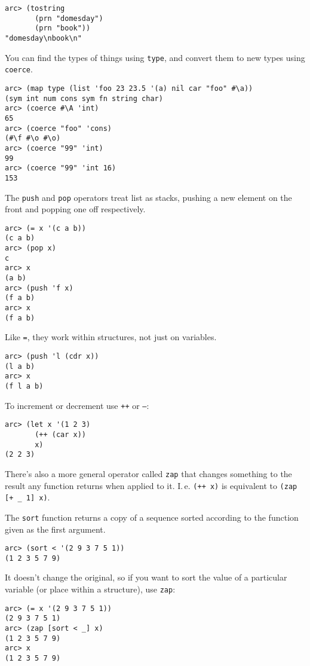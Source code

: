 \documentclass[a4paper,12pt]{book}
\begin{document}
\begin{verbatim}
arc> (tostring                  
       (prn "domesday")
       (prn "book"))
"domesday\nbook\n"
\end{verbatim}

You can find the types of things using \verb|type|, and convert them to
new types using \verb|coerce|.

\begin{verbatim}
arc> (map type (list 'foo 23 23.5 '(a) nil car "foo" #\a))
(sym int num cons sym fn string char)
arc> (coerce #\A 'int)
65
arc> (coerce "foo" 'cons)
(#\f #\o #\o)
arc> (coerce "99" 'int)
99
arc> (coerce "99" 'int 16)
153
\end{verbatim}

The \verb|push| and \verb|pop| operators treat list as stacks, pushing a new
element on the front and popping one off respectively.

\begin{verbatim}
arc> (= x '(c a b))
(c a b)
arc> (pop x)
c
arc> x
(a b)
arc> (push 'f x)
(f a b)
arc> x
(f a b)
\end{verbatim}

Like {\tt=}, they work within structures, not just on variables.

\begin{verbatim}
arc> (push 'l (cdr x))
(l a b)
arc> x
(f l a b)
\end{verbatim}

To increment or decrement use {\tt++} or {\tt--}:

\begin{verbatim}
arc> (let x '(1 2 3) 
       (++ (car x))
       x)           
(2 2 3)
\end{verbatim}

There's also a more general operator called \verb|zap| that changes something
to the result any function returns when applied to it.  I.\,e. \verb|(++ x)|
is equivalent to \verb|(zap [+ _ 1] x)|.

The \verb|sort| function returns a copy of a sequence sorted according to
the function given as the first argument.

\begin{verbatim}
arc> (sort < '(2 9 3 7 5 1))
(1 2 3 5 7 9)
\end{verbatim}

It doesn't change the original, so if you want to sort the value
of a particular variable (or place within a structure), use \verb|zap|:

\begin{verbatim}
arc> (= x '(2 9 3 7 5 1))
(2 9 3 7 5 1)
arc> (zap [sort < _] x)
(1 2 3 5 7 9)
arc> x
(1 2 3 5 7 9)
\end{verbatim}
\end{document}
